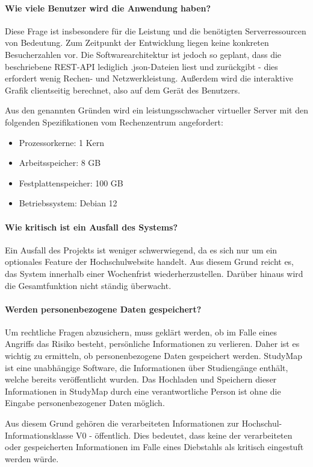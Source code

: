 \paragraph*{Wie viele Benutzer wird die Anwendung haben?}
Diese Frage ist insbesondere für die Leistung und die benötigten Serverressourcen von Bedeutung. Zum Zeitpunkt der Entwicklung liegen keine konkreten Besucherzahlen vor. Die Softwarearchitektur ist jedoch so geplant, dass die beschriebene REST-API lediglich .json-Dateien liest und zurückgibt - dies erfordert wenig Rechen- und Netzwerkleistung. Außerdem wird die interaktive Grafik clientseitig berechnet, also auf dem Gerät des Benutzers.

Aus den genannten Gründen wird ein leistungsschwacher virtueller Server mit den folgenden Spezifikationen vom Rechenzentrum angefordert:
\begin{itemize}
    \item Prozessorkerne: 1 Kern
    \item Arbeitsspeicher: 8 GB
    \item Festplattenspeicher: 100 GB
    \item Betriebssystem: Debian 12
\end{itemize}

\paragraph*{Wie kritisch ist ein Ausfall des Systems?}
Ein Ausfall des Projekts ist weniger schwerwiegend, da es sich nur um ein optionales Feature der Hochschulwebsite handelt. Aus diesem Grund reicht es, das System innerhalb einer Wochenfrist wiederherzustellen. Darüber hinaus wird die Gesamtfunktion nicht ständig überwacht.

\paragraph*{Werden personenbezogene Daten gespeichert?}
Um rechtliche Fragen abzusichern, muss geklärt werden, ob im Falle eines Angriffs das Risiko besteht, persönliche Informationen zu verlieren. Daher ist es wichtig zu ermitteln, ob personenbezogene Daten gespeichert werden. StudyMap ist eine unabhängige Software, die Informationen über Studiengänge enthält, welche bereits veröffentlicht wurden. Das Hochladen und Speichern dieser Informationen in StudyMap durch eine verantwortliche Person ist ohne die Eingabe personenbezogener Daten möglich.

Aus diesem Grund gehören die verarbeiteten Informationen zur Hochschul-Informationsklasse \glqq V0 - öffentlich\grqq{}. Dies bedeutet, dass keine der verarbeiteten oder gespeicherten Informationen im Falle eines Diebstahls als kritisch eingestuft werden würde.

